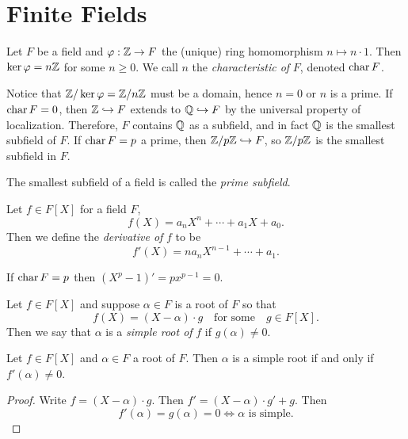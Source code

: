 \section{Finite Fields}

\begin{dfn}
	Let $F$ be a field and $\varphi : \mathbb{Z} \to F$ the (unique) ring homomorphism $n \mapsto n \cdot 1$. Then $\ker \varphi = n \mathbb{Z}$ for some $n \geq 0$. We call $n$ the \emph{characteristic of } $F$, denoted $\operatorname{char} F$.
\end{dfn}

\begin{rem}
	Notice that $\mathbb{Z} / \ker \varphi = \mathbb{Z} / n \mathbb{Z}$ must be a domain, hence $n = 0$ or $n$ is a prime. If $\operatorname{char} F = 0$, then $\mathbb{Z} \hookrightarrow F$ extends to $\mathbb{Q} \hookrightarrow F$ by the universal property of localization. Therefore, $F$ contains $\mathbb{Q}$ as a subfield, and in fact $\mathbb{Q}$ is the smallest subfield of $F$. If $\operatorname{char} F = p$ a prime, then $\mathbb{Z} / p \mathbb{Z} \hookrightarrow F$, so $\mathbb{Z} / p \mathbb{Z}$ is the smallest subfield in $F$.
\end{rem}

\begin{dfn}
	The smallest subfield of a field is called the \emph{prime subfield}.
\end{dfn}

\begin{dfn}
	Let $f \in F[X]$ for a field $F$,
	\[
		f(X) = a_n X^n + \cdots + a_1 X + a_0.
	\]
	Then we define the \emph{derivative of} $f$ to be
	\[
		f'(X) = n a_n X^{n-1} + \cdots + a_1.
	\]
\end{dfn}

\begin{eg}
	If $\operatorname{char} F = p$ then $(X^p - 1)' = p x^{p-1} = 0$.
\end{eg}

\begin{dfn}
	Let $f \in F[X]$ and suppose $\alpha \in F$ is a root of $F$ so that
	\[
		f(X) = (X - \alpha) \cdot g \quad \text{for some} \quad g \in F[X].
	\]
	Then we say that $\alpha$ is a \emph{simple root of } $f$ if $g(\alpha) \neq 0$.
\end{dfn}

\begin{lem}
	Let $f \in F[X]$ and $\alpha \in F$ a root of $F$. Then $\alpha$ is a simple root if and only if $f'(\alpha) \neq 0$.
\end{lem}
\begin{proof}
	Write $f = (X - \alpha) \cdot g$. Then $f' = (X - \alpha) \cdot g' + g$. Then
	\[
		f'(\alpha) = g(\alpha) = 0 \iff \alpha \text{ is simple.}
	\]
\end{proof}


